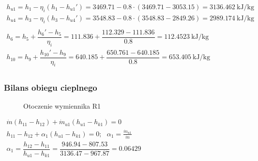 \begin{math}
	\begin{array}{l}
		h_{u1} = h_1 - \eta_i ( h_1 - h_{u1}' ) =
			\num{3469,71} - \num{0,8} \cdot ( \num{3469,71} - \num{3053,15} ) =
			\SI{3136,462}{\kilo\joule\per\kilogram} \\
		h_{u4} = h_3 - \eta_i ( h_3 - h_{u4}' ) =
			\num{3548,83} - \num{0,8} \cdot ( \num{3548,83} - \num{2849,26} ) =
			\SI{2989,174}{\kilo\joule\per\kilogram} \\
		\\
		h_6 = h_5 + \dfrac{h_6' - h_5}{\eta_i} =
			\num{111,836} + \dfrac{\num{112,329} - \num{111,836}}{\num{0,8}} =
			\SI{112,4523}{\kilo\joule\per\kilogram} \\
		h_{10} = h_9 + \dfrac{h_{10}' - h_9}{\eta_i} =
			\num{640,185} + \dfrac{\num{650,761} - \num{640,185}}{\num{0,8}} =
			\SI{653,405}{\kilo\joule\per\kilogram} \\
	\end{array}
\end{math}

\subsubsection{Bilans obiegu cieplnego}

\begin{figure}[H]
	\centering

	\caption{Otoczenie wymiennika R1}
\end{figure}

\begin{math}
	\begin{array}{l}
		\dot m ( h_{11} - h_{12} ) + \dot m_{u1} ( h_{u1} - h_{k1} ) = 0 \\
		h_{11} - h_{12} + \alpha_1 ( h_{u1} - h_{k1} ) = 0;
			~~~ \alpha_1 = \frac{\dot m_{u1}}{\dot m} \\
		\alpha_1 = \dfrac{h_{12} - h_{11}}{h_{u1} - h_{k1}}
			= \dfrac{\num{946,94} - \num{807,53}}{\num{3136,47} - \num{967,87}}
			= \num{0,06429} \\
	\end{array}
\end{math}

